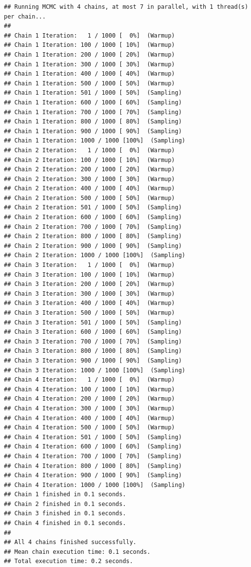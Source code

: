 \documentclass[
]{book}
\begin{document}
\begin{verbatim}
## Running MCMC with 4 chains, at most 7 in parallel, with 1 thread(s) per chain...
## 
## Chain 1 Iteration:   1 / 1000 [  0%]  (Warmup) 
## Chain 1 Iteration: 100 / 1000 [ 10%]  (Warmup) 
## Chain 1 Iteration: 200 / 1000 [ 20%]  (Warmup) 
## Chain 1 Iteration: 300 / 1000 [ 30%]  (Warmup) 
## Chain 1 Iteration: 400 / 1000 [ 40%]  (Warmup) 
## Chain 1 Iteration: 500 / 1000 [ 50%]  (Warmup) 
## Chain 1 Iteration: 501 / 1000 [ 50%]  (Sampling) 
## Chain 1 Iteration: 600 / 1000 [ 60%]  (Sampling) 
## Chain 1 Iteration: 700 / 1000 [ 70%]  (Sampling) 
## Chain 1 Iteration: 800 / 1000 [ 80%]  (Sampling) 
## Chain 1 Iteration: 900 / 1000 [ 90%]  (Sampling) 
## Chain 1 Iteration: 1000 / 1000 [100%]  (Sampling) 
## Chain 2 Iteration:   1 / 1000 [  0%]  (Warmup) 
## Chain 2 Iteration: 100 / 1000 [ 10%]  (Warmup) 
## Chain 2 Iteration: 200 / 1000 [ 20%]  (Warmup) 
## Chain 2 Iteration: 300 / 1000 [ 30%]  (Warmup) 
## Chain 2 Iteration: 400 / 1000 [ 40%]  (Warmup) 
## Chain 2 Iteration: 500 / 1000 [ 50%]  (Warmup) 
## Chain 2 Iteration: 501 / 1000 [ 50%]  (Sampling) 
## Chain 2 Iteration: 600 / 1000 [ 60%]  (Sampling) 
## Chain 2 Iteration: 700 / 1000 [ 70%]  (Sampling) 
## Chain 2 Iteration: 800 / 1000 [ 80%]  (Sampling) 
## Chain 2 Iteration: 900 / 1000 [ 90%]  (Sampling) 
## Chain 2 Iteration: 1000 / 1000 [100%]  (Sampling) 
## Chain 3 Iteration:   1 / 1000 [  0%]  (Warmup) 
## Chain 3 Iteration: 100 / 1000 [ 10%]  (Warmup) 
## Chain 3 Iteration: 200 / 1000 [ 20%]  (Warmup) 
## Chain 3 Iteration: 300 / 1000 [ 30%]  (Warmup) 
## Chain 3 Iteration: 400 / 1000 [ 40%]  (Warmup) 
## Chain 3 Iteration: 500 / 1000 [ 50%]  (Warmup) 
## Chain 3 Iteration: 501 / 1000 [ 50%]  (Sampling) 
## Chain 3 Iteration: 600 / 1000 [ 60%]  (Sampling) 
## Chain 3 Iteration: 700 / 1000 [ 70%]  (Sampling) 
## Chain 3 Iteration: 800 / 1000 [ 80%]  (Sampling) 
## Chain 3 Iteration: 900 / 1000 [ 90%]  (Sampling) 
## Chain 3 Iteration: 1000 / 1000 [100%]  (Sampling) 
## Chain 4 Iteration:   1 / 1000 [  0%]  (Warmup) 
## Chain 4 Iteration: 100 / 1000 [ 10%]  (Warmup) 
## Chain 4 Iteration: 200 / 1000 [ 20%]  (Warmup) 
## Chain 4 Iteration: 300 / 1000 [ 30%]  (Warmup) 
## Chain 4 Iteration: 400 / 1000 [ 40%]  (Warmup) 
## Chain 4 Iteration: 500 / 1000 [ 50%]  (Warmup) 
## Chain 4 Iteration: 501 / 1000 [ 50%]  (Sampling) 
## Chain 4 Iteration: 600 / 1000 [ 60%]  (Sampling) 
## Chain 4 Iteration: 700 / 1000 [ 70%]  (Sampling) 
## Chain 4 Iteration: 800 / 1000 [ 80%]  (Sampling) 
## Chain 4 Iteration: 900 / 1000 [ 90%]  (Sampling) 
## Chain 4 Iteration: 1000 / 1000 [100%]  (Sampling) 
## Chain 1 finished in 0.1 seconds.
## Chain 2 finished in 0.1 seconds.
## Chain 3 finished in 0.1 seconds.
## Chain 4 finished in 0.1 seconds.
## 
## All 4 chains finished successfully.
## Mean chain execution time: 0.1 seconds.
## Total execution time: 0.2 seconds.
\end{verbatim}
\end{document}
